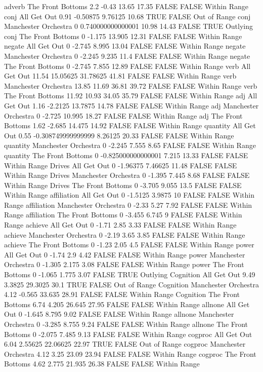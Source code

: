 adverb The Front Bottoms 2.2 -0.43 13.65 17.35 FALSE FALSE Within Range
conj All Get Out 0.91 -0.50875 9.76125 10.68 TRUE FALSE Out of Range
conj Manchester Orchestra 0 0.740000000000001 10.98 14.43 FALSE TRUE Outlying
conj The Front Bottoms 0 -1.175 13.905 12.31 FALSE FALSE Within Range
negate All Get Out 0 -2.745 8.995 13.04 FALSE FALSE Within Range
negate Manchester Orchestra 0 -2.245 9.235 11.4 FALSE FALSE Within Range
negate The Front Bottoms 0 -2.745 7.855 12.89 FALSE FALSE Within Range
verb All Get Out 11.54 15.05625 31.78625 41.81 FALSE FALSE Within Range
verb Manchester Orchestra 13.85 11.69 36.81 39.72 FALSE FALSE Within Range
verb The Front Bottoms 11.92 10.93 34.05 35.79 FALSE FALSE Within Range
adj All Get Out 1.16 -2.2125 13.7875 14.78 FALSE FALSE Within Range
adj Manchester Orchestra 0 -2.725 10.995 18.27 FALSE FALSE Within Range
adj The Front Bottoms 1.62 -2.685 14.475 14.92 FALSE FALSE Within Range
quantity All Get Out 0.55 -0.308749999999999 8.26125 20.33 FALSE FALSE Within Range
quantity Manchester Orchestra 0 -2.245 7.555 8.65 FALSE FALSE Within Range
quantity The Front Bottoms 0 -0.825000000000001 7.215 13.33 FALSE FALSE Within Range
Drives All Get Out 0 -1.96375 7.46625 11.48 FALSE FALSE Within Range
Drives Manchester Orchestra 0 -1.395 7.445 8.68 FALSE FALSE Within Range
Drives The Front Bottoms 0 -3.705 9.055 13.5 FALSE FALSE Within Range
affiliation All Get Out 0 -1.5125 3.9875 10 FALSE FALSE Within Range
affiliation Manchester Orchestra 0 -2.33 5.27 7.92 FALSE FALSE Within Range
affiliation The Front Bottoms 0 -3.455 6.745 9 FALSE FALSE Within Range
achieve All Get Out 0 -1.71 2.85 3.33 FALSE FALSE Within Range
achieve Manchester Orchestra 0 -2.19 3.65 3.85 FALSE FALSE Within Range
achieve The Front Bottoms 0 -1.23 2.05 4.5 FALSE FALSE Within Range
power All Get Out 0 -1.74 2.9 4.42 FALSE FALSE Within Range
power Manchester Orchestra 0 -1.305 2.175 3.08 FALSE FALSE Within Range
power The Front Bottoms 0 -1.065 1.775 3.07 FALSE TRUE Outlying
Cognition All Get Out 9.49 3.3825 29.3025 30.1 TRUE FALSE Out of Range
Cognition Manchester Orchestra 4.12 -0.565 33.635 28.91 FALSE FALSE Within Range
Cognition The Front Bottoms 6.74 4.205 26.645 27.95 FALSE FALSE Within Range
allnone All Get Out 0 -1.645 8.795 9.02 FALSE FALSE Within Range
allnone Manchester Orchestra 0 -3.285 8.755 9.24 FALSE FALSE Within Range
allnone The Front Bottoms 0 -2.075 7.485 9.13 FALSE FALSE Within Range
cogproc All Get Out 6.04 2.55625 22.06625 22.97 TRUE FALSE Out of Range
cogproc Manchester Orchestra 4.12 3.25 23.09 23.94 FALSE FALSE Within Range
cogproc The Front Bottoms 4.62 2.775 21.935 26.38 FALSE FALSE Within Range
